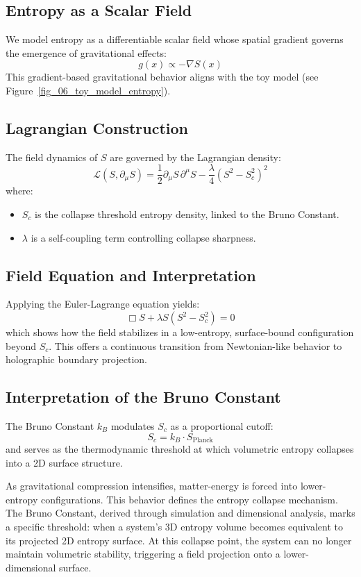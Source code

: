 \documentclass[12pt]{article}
\begin{document}
\subsection*{Entropy as a Scalar Field}
We model entropy as a differentiable scalar field whose spatial gradient governs the emergence of gravitational effects:
\[
g(x) \propto -\nabla S(x)
\]
This gradient-based gravitational behavior aligns with the toy model (see Figure~\ref{fig_06_toy_model_entropy}).

\subsection*{Lagrangian Construction}
The field dynamics of $S$ are governed by the Lagrangian density:
\[
\mathcal{L}(S, \partial_\mu S) = \frac{1}{2} \partial_\mu S \, \partial^\mu S - \frac{\lambda}{4}(S^2 - S_c^2)^2
\]
where:
\begin{itemize}
\item $S_c$ is the collapse threshold entropy density, linked to the Bruno Constant.
\item $\lambda$ is a self-coupling term controlling collapse sharpness.
\end{itemize}

\subsection*{Field Equation and Interpretation}
Applying the Euler-Lagrange equation yields:
\[
\Box S + \lambda S(S^2 - S_c^2) = 0
\]
which shows how the field stabilizes in a low-entropy, surface-bound configuration beyond $S_c$. This offers a continuous transition from Newtonian-like behavior to holographic boundary projection.

\subsection*{Interpretation of the Bruno Constant}
The Bruno Constant $k_B$ modulates $S_c$ as a proportional cutoff:
\[
S_c = k_B \cdot S_{\text{Planck}}
\]
and serves as the thermodynamic threshold at which volumetric entropy collapses into a 2D surface structure.

As gravitational compression intensifies, matter-energy is forced into lower-entropy configurations. This behavior defines the entropy collapse mechanism. The Bruno Constant, derived through simulation and dimensional analysis, marks a specific threshold: when a system's 3D entropy volume becomes equivalent to its projected 2D entropy surface. At this collapse point, the system can no longer maintain volumetric stability, triggering a field projection onto a lower-dimensional surface.
\end{document}
